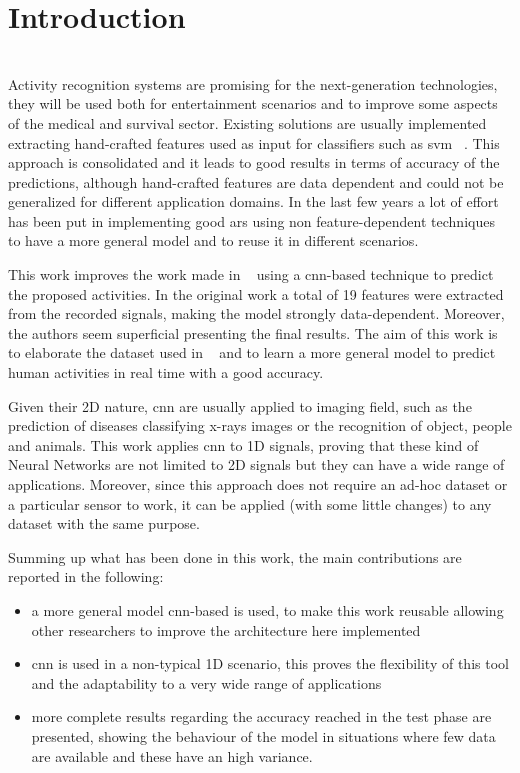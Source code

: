 
\section{Introduction}
\label{sec:introduction}

\\

Activity recognition systems are promising for the next-generation technologies, they will be used both for entertainment scenarios and to improve some aspects of the medical and survival sector.
Existing solutions are usually implemented extracting hand-crafted features used as input for classifiers such as \gls{svm} ~\cite{Elvira14, Hamalainen11, Khan10}.
This approach is consolidated and it leads to good results in terms of accuracy of the predictions, although hand-crafted features are data dependent and could not be generalized for different application domains.
In the last few years a lot of effort has been put in implementing good \gls{ars} using non feature-dependent techniques to have a more general model and to reuse it in different scenarios.

This work improves the work made in ~\cite{Frank10} using a \gls{cnn}-based technique to predict the proposed activities.
In the original work a total of 19 features were extracted from the recorded signals, making the model strongly data-dependent.
Moreover, the authors seem superficial presenting the final results.
The aim of this work is to elaborate the dataset used in ~\cite{Frank10} and to learn a more general model to predict human activities in real time with a good accuracy.

Given their 2D nature, \gls{cnn} are usually applied to imaging field, such as the prediction of diseases classifying x-rays images or the recognition of object, people and animals.
This work applies \gls{cnn} to 1D signals, proving that these kind of Neural Networks are not limited to 2D signals but they can have a wide range of applications.
Moreover, since this approach does not require an ad-hoc dataset or a particular sensor to work, it can be applied (with some little changes) to any dataset with the same purpose.

Summing up what has been done in this work, the main contributions are reported in the following:
\begin{itemize}
\item a more general model \gls{cnn}-based is used, to make this work reusable allowing other researchers to improve the architecture here implemented
\item \gls{cnn} is used in a non-typical 1D scenario, this proves the flexibility of this tool and the adaptability to a very wide range of applications
\item more complete results regarding the accuracy reached in the test phase are presented, showing the behaviour of the model in situations where few data are available and these have an high variance.
\end{itemize}

